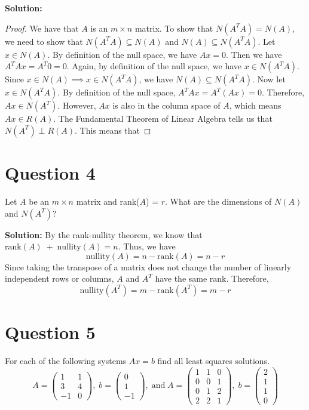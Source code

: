 \documentclass{article}
\begin{document}
\vspace{0.5cm}
\noindent\textbf{Solution:}
\begin{proof}
    We have that $A$ is an $m \times n$ matrix.
    To show that $N(A^T A) = N(A)$, we need to show that $N(A^T A) \subseteq N(A)$ and $N(A) \subseteq N(A^T A)$.
    Let $x \in N(A)$.
    By definition of the null space, we have $Ax = 0$.
    Then we have $A^T A x = A^T 0 = 0$.
    Again, by definition of the null space, we have $x \in N(A^T A)$.
    Since $x \in N(A) \implies x \in N(A^T A)$, we have $N(A) \subseteq N(A^T A)$.
    Now let $x \in N(A^T A)$.
    By definition of the null space, $A^T A x = A^T (A x) = 0$.
    Therefore, $Ax \in N(A^T)$.
    However, $Ax$ is also in the column space of $A$, which means $Ax \in R(A)$.
    The Fundamental Theorem of Linear Algebra tells us that $N(A^T) \perp R(A)$.
    This means that %
\end{proof}

\section*{Question 4}
Let $A$ be an $m \times n$ matrix and rank($A$) = $r$.
What are the dimensions of $N(A)$ and $N(A^T)$?

\vspace{0.5cm}
\noindent\textbf{Solution:}
By the rank-nullity theorem, we know that $\text{rank}(A) \; + \; \text{nullity}(A) = n$.
Thus, we have
$$ \text{nullity}(A) = n - \text{rank}(A) = n - r $$
Since taking the transpose of a matrix does not change the number of linearly independent rows or columns,
$A$ and $A^T$ have the same rank.
Therefore,
$$ \text{nullity}(A^T) = m - \text{rank}(A^T) = m - r $$

\section*{Question 5}
For each of the following systems $Ax = b$ find all least squares solutions.
$$
A = \begin{pmatrix} 1 & 1 \\ 3 & 4 \\ -1 & 0 \end{pmatrix}, \; b = \begin{pmatrix} 0 \\ 1 \\ -1 \end{pmatrix}, \; \text{and} \;
A = \begin{pmatrix} 1 & 1 & 0 \\ 0 & 0 & 1 \\ 0 & 1 & 2 \\ 2 & 2 & 1 \end{pmatrix}, \; b = \begin{pmatrix} 2 \\ 1 \\ 1 \\ 0 \end{pmatrix}
$$
\end{document}
